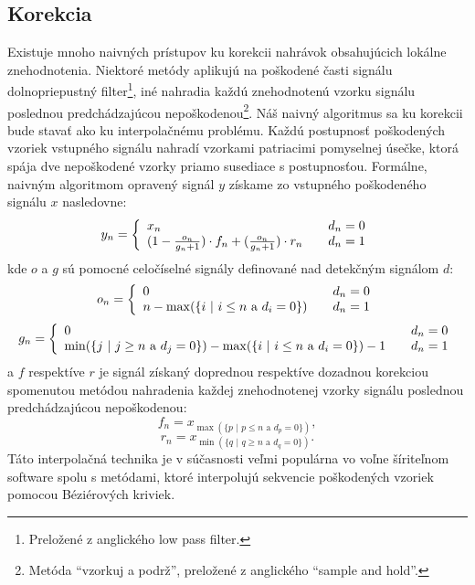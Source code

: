\subsection{Korekcia}
Existuje mnoho naivných prístupov ku korekcii nahrávok obsahujúcich lokálne znehodnotenia. Niektoré metódy aplikujú na poškodené časti signálu dolnopriepustný filter\footnote{Preložené z anglického low pass filter.}, iné nahradia každú znehodnotenú vzorku signálu poslednou predchádzajúcou nepoškodenou\footnote{Metóda ``vzorkuj a podrž'', preložené z anglického ``sample and hold''.}. Náš naivný algoritmus sa ku korekcii bude stavať ako ku interpolačnému problému. Každú postupnosť poškodených vzoriek vstupného signálu nahradí vzorkami patriacimi pomyselnej úsečke, ktorá spája dve nepoškodené vzorky priamo susediace s postupnosťou. Formálne, naivným algoritmom opravený signál $y$ získame zo vstupného poškodeného signálu $x$ nasledovne:
$$y_n = \left\{\begin{array}{l l}
	x_n & \quad d_n=0\\
	(1-\frac{o_n}{g_n+1}) \cdot f_n + (\frac{o_n}{g_n+1}) \cdot r_n & \quad d_n=1\\
\end{array} \right.$$
kde $o$ a $g$ sú pomocné celočíselné signály definované nad detekčným signálom $d$:
$$o_n = \left\{\begin{array}{l l}
	0 & \quad d_n=0\\
	n - \max(\{\text{$i$ | $i\leq n$ a $d_i=0$} \}) & \quad d_n=1\\
\end{array} \right.$$
$$g_n = \left\{\begin{array}{l l}
	0 & \quad d_n=0\\
	\min(\{\text{$j$ | $j \geq n$ a $d_j=0$} \}) - \max(\{\text{$i$ | $i \leq n$ a $d_i=0$} \}) - 1 & \quad d_n=1\\
\end{array} \right.$$
a $f$ respektíve $r$ je signál získaný doprednou respektíve dozadnou korekciou spomenutou metódou nahradenia každej znehodnotenej vzorky signálu poslednou predchádzajúcou nepoškodenou:
$$f_n = x_{\max(\{\text{$p$ | $p \leq n$ a $d_p=0$} \})},$$ 
$$r_n = x_{\min(\{\text{$q$ | $q \geq n$ a $d_q=0$} \})}.$$
Táto interpolačná technika je v súčasnosti veľmi populárna vo voľne šíriteľnom software spolu s metódami, ktoré interpolujú sekvencie poškodených vzoriek pomocou Béziérových kriviek.

